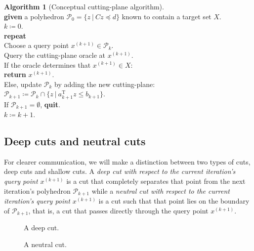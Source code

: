 \documentclass[11pt]{amsart}
\theoremstyle{definition}
\newtheorem{algorithm}{Algorithm}
\theoremstyle{remark}
\newcommand{\ind}{\hspace*{0.5cm}}
\newcommand{\transpose}{\text{T}}
\begin{document}
        \begin{algorithm}[Conceptual cutting-plane algorithm]
        \label{a:conceptual_cp_alg}\mbox{}\\
            \ind \textbf{given} a polyhedron $\mathcal{P}_0 = \{z \:|\: Cz \preceq d\}$ known to contain a target set $X$. \\
            \ind $k \coloneqq 0$. \\
            \ind \textbf{repeat} \\
            \ind\ind Choose a query point $x^{(k+1)} \in \mathcal{P}_k$. \\
            \ind\ind Query the cutting-plane oracle at $x^{(k+1)}$. \\
            \ind\ind If the oracle determines that $x^{(k+1)} \in X$: \\
            \ind\ind\ind\textbf{return} $x^{(k+1)}$. \\
            \ind\ind Else, update $\mathcal{P}_k$ by adding the new cutting-plane: \\ 
            \ind\ind\ind $\mathcal{P}_{k+1} \coloneqq \mathcal{P}_k \cap \{z \:|\: a_{k+1}^\transpose z \leq b_{k+1} \}$. \\
            \ind\ind If $\mathcal{P}_{k+1} = \emptyset$, \textbf{quit}. \\
            \ind\ind $k \coloneqq k+1$.
        \end{algorithm}


    \subsection{Deep cuts and neutral cuts}
        For clearer communication, we will make a distinction between two types of cuts, deep cuts and shallow cuts. A \emph{deep cut with respect to the current iteration's query point $x^{(k+1)}$} is a cut that completely separates that point from the next iteration's polyhedron $\mathcal{P}_{k+1}$ while a \emph{neutral cut with respect to the current iteration's query point $x^{(k+1)}$} is a cut such that that point lies on the boundary of $\mathcal{P}_{k+1}$, that is, a cut that passes directly through the query point $x^{(k+1)}$.

        \begin{figure}
            \caption{A deep cut.}
        \end{figure}

        \begin{figure}
            \caption{A neutral cut.}
        \end{figure}
\end{document}
